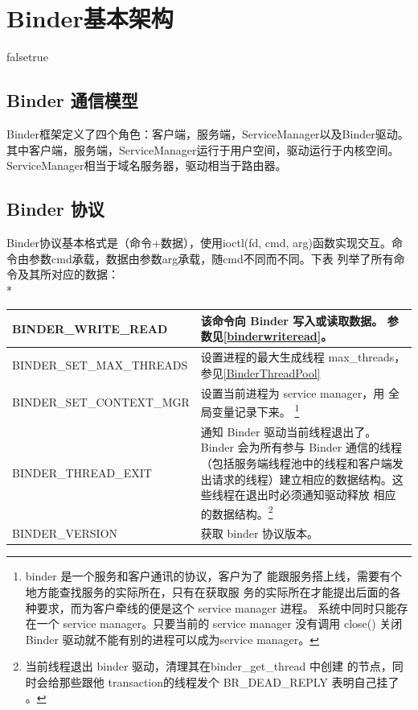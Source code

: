 \documentclass[a4paper,11pt]{article}
\begin{document}
\section{Binder基本架构}

\def\oo{false}
\if \oo true
\fi

\subsection{ Binder 通信模型}
Binder框架定义了四个角色：客户端，服务端，ServiceManager以及Binder驱动。
其中客户端，服务端，ServiceManager运行于用户空间，驱动运行于内核空间。
ServiceManager相当于域名服务器，驱动相当于路由器。

\subsection{Binder 协议}\label{protocol}
Binder协议基本格式是（命令+数据），使用ioctl(fd, cmd,
arg)函数实现交互。命令由参数cmd承载，数据由参数arg承载，随cmd不同而不同。下表
列举了所有命令及其所对应的数据：\\*
\begin{minipage}{\textwidth}
\footnotesize
\begin{tabular}{|p{}|p{}|}\hline
    BINDER_WRITE_READ & 该命令向 Binder 写入或读取数据。
    参数见\autoref{binderwriteread}。\\\hline

    BINDER_SET_MAX_THREADS & 设置进程的最大生成线程 max_threads，
    参见\autoref{BinderThreadPool}\\\hline

    BINDER_SET_CONTEXT_MGR & 设置当前进程为 service manager，用
        全局变量记录下来。 \footnote{binder 是一个服务和客户通讯的协议，客户为了
        能跟服务搭上线，需要有个地方能查找服务的实际所在，只有在获取服
        务的实际所在才能提出后面的各种要求，而为客户牵线的便是这个
        service manager 进程。
        系统中同时只能存在一个 service manager。只要当前的 service manager
        没有调用 close() 关闭 Binder 驱动就不能有别的进程可以成为service manager。}
        \\\hline
    BINDER_THREAD_EXIT & 通知 Binder 驱动当前线程退出了。 Binder 会为所有参与
    Binder 通信的线程（包括服务端线程池中的线程和客户端发出请求的线程）建立相应的数据结构。这些线程在退出时必须通知驱动释放
    相应的数据结构。\footnote{当前线程退出 binder 驱动，清理其在binder_get_thread 中创建
    的节点，同时会给那些跟他 transaction的线程发个 BR_DEAD_REPLY 表明自己挂了
    。}\\\hline

    BINDER_VERSION & 获取 binder 协议版本。\\\hline

\end{tabular}
\end{minipage}
\end{document}
